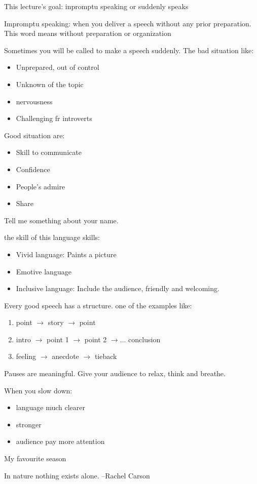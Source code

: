 \begin{notation}
    This lecture's goal: inpromptu speaking or suddenly speaks
\end{notation}
\begin{defi}
    Impromptu speaking: when you deliver a speech without any prior preparation. This word means without preparation or organization
\end{defi}
Sometimes you will be called to make a speech suddenly. The bad situation like:
\begin{itemize}
    \item Unprepared, out of control
    \item Unknown of the topic
    \item nervousness
    \item Challenging fr introverts
\end{itemize}
Good situation are:
\begin{itemize}
    \item Skill to communicate
    \item Confidence
    \item People's admire
    \item Share
\end{itemize}
\begin{eg}
    Tell me something about your name.
\end{eg}
the skill of this language skills:
\begin{itemize}
    \item Vivid language: Paints a picture
    \item Emotive language
    \item Inclusive language: Include the audience, friendly and welcoming.
\end{itemize}
Every good speech has a structure. one of the examples like:
\begin{enumerate}
    \item point $\to $ story $\to $ point
    \item intro $\to $ point 1 $\to $ point 2 $\to \ldots $ conclusion
    \item feeling $\to $ anecdote $\to $ tieback
    
\end{enumerate}
Pauses are meaningful. Give your audience to relax, think and breathe.

When you slow down:
\begin{itemize}
    \item language much clearer
    \item stronger
    \item audience pay more attention
\end{itemize}
\begin{eg}
    My favourite season
\end{eg}
\begin{notation}
    In nature nothing exists alone. --Rachel Carson
\end{notation}
